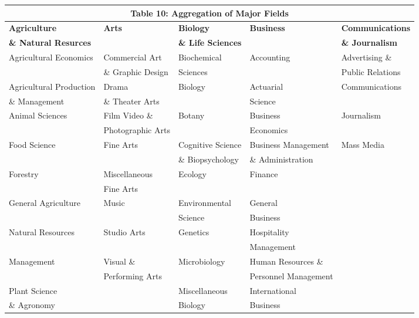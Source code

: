 \documentclass[11pt]{article}
\theoremstyle{definition}
\begin{document}
\vspace{2.5mm}
\noindent
\begin{center}
\begingroup \scriptsize
\begin{tabular}{|l| l| l| l |l|}
\hline\hline
\multicolumn{5}{c}{\textbf{Table 10: Aggregation of Major Fields}} \\
\hline\hline 
\textbf{Agriculture} & \textbf{Arts} & \textbf{Biology} & \textbf{Business} & \textbf{Communications}  \\
 \textbf{\& Natural Resurces} &\textbf{} & \textbf{\& Life Sciences} &\textbf{} &  \textbf{\& Journalism}   \\ 
 \hline\hline \rowcolor{Gray} 
 Agricultural Economics & Commercial Art  & Biochemical & Accounting & Advertising \& \\ 
 \rowcolor {Gray} 
  & \& Graphic Design & Sciences &  &  Public Relations \\
 \hline
 Agricultural Production & Drama & Biology & Actuarial & Communications \\
 \& Management &  \& Theater Arts & & Science & \\
 \hline \rowcolor{Gray}
 Animal Sciences &  Film Video \& & Botany & Business & Journalism \\
 \rowcolor{Gray}
  &  Photographic Arts & & Economics & \\
 \hline 
 Food Science & Fine Arts & Cognitive Science & Business Management & Mass Media \\
  &  & \& Biopsychology & \& Administration & \\
  \hline \rowcolor{Gray}
 Forestry & Miscellaneous & Ecology & Finance & \\
 \rowcolor{Gray}
  &  Fine Arts & & & \\
  \hline
 General Agriculture &  Music & Environmental & General & \\
  &  & Science & Business & \\
  \hline \rowcolor{Gray}
 Natural Resources & Studio Arts & Genetics & Hospitality & \\
 \rowcolor{Gray}
  & & & Management & \\
  \hline 
 Management & Visual \& & Microbiology & Human Resources \& & \\
  & Performing Arts &  & Personnel Management & \\
  \hline \rowcolor{Gray}
 Plant Science & & Miscellaneous & International & \\
 \rowcolor{Gray}
 \& Agronomy &  & Biology & Business & \\

\end{tabular}
\end{center}
\end{document}
